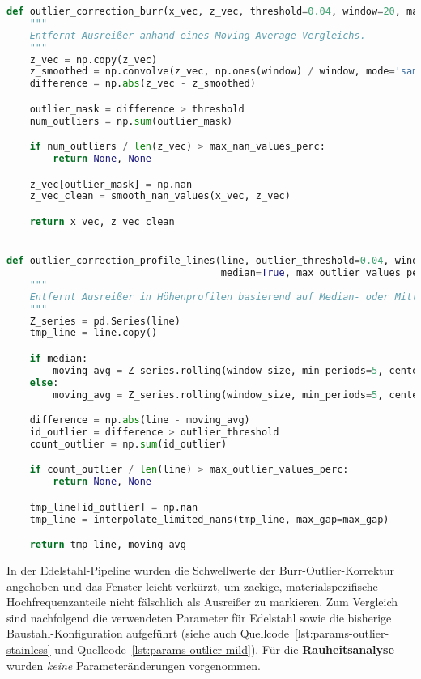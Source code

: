 \begin{lstlisting}[language=Python, caption={Outlier Detection/Correction in der Profilvorverarbeitung (Burr-Kanal)}, label={lst:outlier-correction}]
def outlier_correction_burr(x_vec, z_vec, threshold=0.04, window=20, max_nan_values_perc=0.4):
    """
    Entfernt Ausreißer anhand eines Moving-Average-Vergleichs.
    """
    z_vec = np.copy(z_vec)
    z_smoothed = np.convolve(z_vec, np.ones(window) / window, mode='same')
    difference = np.abs(z_vec - z_smoothed)

    outlier_mask = difference > threshold
    num_outliers = np.sum(outlier_mask)

    if num_outliers / len(z_vec) > max_nan_values_perc:
        return None, None

    z_vec[outlier_mask] = np.nan
    z_vec_clean = smooth_nan_values(x_vec, z_vec)

    return x_vec, z_vec_clean


def outlier_correction_profile_lines(line, outlier_threshold=0.04, window_size=30,
                                     median=True, max_outlier_values_perc=0.35, max_gap=5):
    """
    Entfernt Ausreißer in Höhenprofilen basierend auf Median- oder Mittelwert-Vergleich.
    """
    Z_series = pd.Series(line)
    tmp_line = line.copy()

    if median:
        moving_avg = Z_series.rolling(window_size, min_periods=5, center=True).median()
    else:
        moving_avg = Z_series.rolling(window_size, min_periods=5, center=True).mean()

    difference = np.abs(line - moving_avg)
    id_outlier = difference > outlier_threshold
    count_outlier = np.sum(id_outlier)

    if count_outlier / len(line) > max_outlier_values_perc:
        return None, None

    tmp_line[id_outlier] = np.nan
    tmp_line = interpolate_limited_nans(tmp_line, max_gap=max_gap)

    return tmp_line, moving_avg
\end{lstlisting}

In der Edelstahl-Pipeline wurden die Schwellwerte der Burr-Outlier-Korrektur angehoben und das Fenster leicht verkürzt, um zackige, materialspezifische Hochfrequenzanteile nicht fälschlich als Ausreißer zu markieren. Zum Vergleich sind nachfolgend die verwendeten Parameter für Edelstahl sowie die bisherige Baustahl-Konfiguration aufgeführt (siehe auch Quellcode~\ref{lst:params-outlier-stainless} und Quellcode~\ref{lst:params-outlier-mild}). Für die \textbf{Rauheitsanalyse} wurden \emph{keine} Parameteränderungen vorgenommen.

